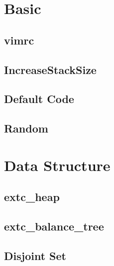 \documentclass[a4paper,10pt,twocolumn,oneside]{article}
\begin{document}
\pagestyle{fancy}
\fancyfoot{}
\fancyhead[R]{\thepage}
\renewcommand{\headrulewidth}{0.4pt}
\renewcommand{\contentsname}{Contents} 

\scriptsize
\tableofcontents

\newpage

\section{Basic}
\subsection{vimrc}


\subsection{IncreaseStackSize}


\subsection{Default Code}


\subsection{Random}


\section{Data Structure}

\subsection{extc\_heap}


\subsection{extc\_balance\_tree}


\subsection{Disjoint Set}

\end{document}
